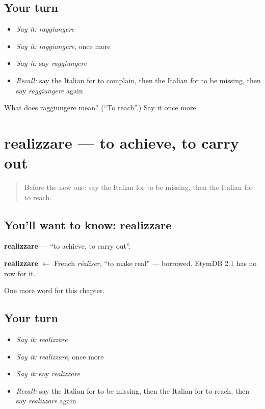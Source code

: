 \subsection*{Your turn}
\begin{itemize}
\raggedright
  \item \emph{Say it:} \emph{raggiungere}
  \item \emph{Say it:} \emph{raggiungere}, once more
  \item \emph{Say it:} say \emph{raggiungere}
  \item \emph{Recall:} say the Italian for to complain, then the Italian for to be missing, then say \emph{raggiungere} again
\end{itemize}

\begin{tcolorbox}[breakable,colback=teal!4,colframe=teal!35!black,title={Before you move on}]
What does raggiungere mean? (\textquotedblleft{}To reach\textquotedblright{}.) Say it once more.
\end{tcolorbox}
\section[realizzare]{realizzare — to achieve, to carry out}

\label{lesson:IT-C239-realizzare}



\begin{quote}
Before the new one: say the Italian for to be missing, then the Italian for to reach.
\end{quote}

\subsection*{You'll want to know: realizzare}
\textbf{realizzare} — \textquotedblleft{}to achieve, to carry out\textquotedblright{}.

\begin{cousinweb}
\textbf{realizzare} $\leftarrow$ French \emph{réaliser}, \textquotedblleft{}to make real\textquotedblright{} — borrowed. EtymDB 2.1 has no row for it.
\end{cousinweb}

\begin{grammarlens}[title={What you've built}]
One more word for this chapter.
\end{grammarlens}

\subsection*{Your turn}
\begin{itemize}
\raggedright
  \item \emph{Say it:} \emph{realizzare}
  \item \emph{Say it:} \emph{realizzare}, once more
  \item \emph{Say it:} say \emph{realizzare}
  \item \emph{Recall:} say the Italian for to be missing, then the Italian for to reach, then say \emph{realizzare} again
\end{itemize}

